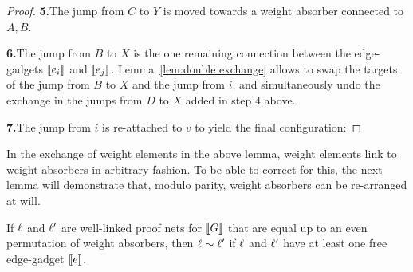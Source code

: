 \documentclass{lmcs}
\begin{document}
\begin{proof}
\displayOcto{\octorollC}

\noindent
\textbf{5.}\quad The jump from $C$ to $Y$ is moved towards a weight absorber connected to $A,B$.


\noindent
\textbf{6.}\quad The jump from $B$ to $X$ is the one remaining connection between the edge-gadgets $\llbracket e_i\rrbracket$ and $\llbracket e_j\rrbracket$. Lemma~\ref{lem:double exchange} allows to swap the targets of the jump from $B$ to $X$ and the jump from $i$, and simultaneously undo the exchange in the jumps from $D$ to $X$ added in step 4 above.


\noindent
\textbf{7.}\quad The jump from $i$ is re-attached to $v$ to yield the final configuration:


\end{proof}

In the exchange of weight elements in the above lemma, weight elements link to weight absorbers in arbitrary fashion. To be able to correct for this, the next lemma will demonstrate that, modulo parity, weight absorbers can be re-arranged at will.

\begin{lemma}
\label{lem:permute weight absorbers}
If $\ell$ and $\ell'$ are well-linked proof nets for $\llbracket G\rrbracket$ that are equal up to an even permutation of weight absorbers, then $\links\perm\links'$ if $\ell$ and $\ell'$ have at least one free edge-gadget $\llbracket e\rrbracket$.
\end{lemma}
\end{document}
